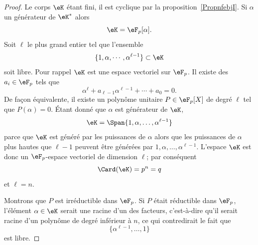 \begin{proof}
    Le corps \( \eK\) étant fini, il est cyclique par la proposition~\ref{PropnfebjI}. Si \( \alpha\) un générateur de \( \eK^*\) alors
    \begin{equation}
        \eK=\eF_p[\alpha].
    \end{equation}
    Soit \( \ell\) le plus grand entier tel que l'ensemble
    \begin{equation}
        \{ 1,\alpha,\cdots,\alpha^{\ell-1} \}\subset\eK
    \end{equation}
    soit libre. Pour rappel \( \eK\) est une espace vectoriel sur \( \eF_p\). Il existe des \( a_i\in \eF_p\) tels que
    \begin{equation}
        \alpha^{\ell}+a_{\ell-1}\alpha^{\ell-1}+\cdots+a_0=0.
    \end{equation}
    De façon équivalente, il existe un polynôme unitaire \( P\in\eF_p[X]\) de degré \( \ell\) tel que \( P(\alpha)=0\). Étant donné que \( \alpha\) est générateur de \( \eK\),
    \begin{equation}
        \eK=\Span\{ 1,\alpha,\ldots, \alpha^{\ell-1} \}
    \end{equation}
    parce que \( \eK\) est généré par les puissances de \( \alpha\) alors que les puissances de \( \alpha\) plus hautes que \( \ell-1\) peuvent être générées par \( 1,\alpha,\ldots, \alpha^{\ell-1}\). L'espace \( \eK\) est donc un \( \eF_p\)-espace vectoriel de dimension \( \ell\); par conséquent
    \begin{equation}
        \Card(\eK)=p^n=q
    \end{equation}
    et \( \ell=n\).

    Montrons que \( P\) est irréductible dans \( \eF_p\). Si \( P\) était réductible dans \( \eF_p\), l'élément \( \alpha\in \eK\) serait une racine d'un des facteurs, c'est-à-dire qu'il serait racine d'un polynôme de degré inférieur à \( n\), ce qui contredirait le fait que
    \begin{equation}
        \{ \alpha^{\ell-1},\ldots, 1 \}
    \end{equation}
    est libre.


\end{proof}
